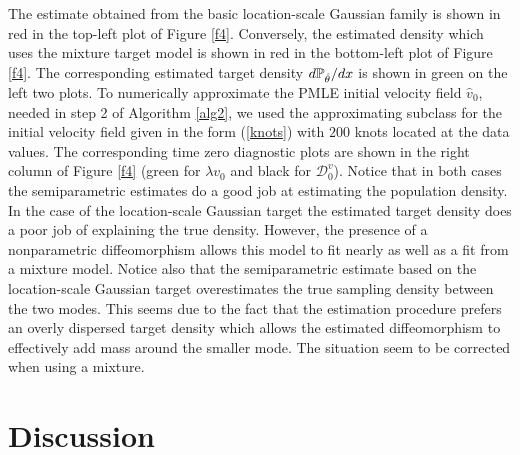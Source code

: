 \documentclass[noinfoline]{imsart}
\begin{document}
The estimate obtained from the basic location-scale Gaussian family is shown in red in the top-left plot of Figure \ref{f4}. Conversely, the estimated density which uses the mixture target model is shown in red in the bottom-left plot of Figure \ref{f4}.   The corresponding estimated target density $d\Bbb P_{\hat \theta}/dx$ is shown in green on the left two plots.
To numerically approximate the PMLE initial velocity field $\hat v_0$, needed in step 2 of Algorithm \ref{alg2},  we used the approximating subclass for the initial velocity field given in the form (\ref{knots}) with $200$ knots located at the data values.
The corresponding time zero diagnostic plots are shown in the right column of Figure \ref{f4} (green for $\lambda v_0$ and black for $\mathcal D_0^v$).  
 Notice that in both cases the semiparametric estimates do a good job at estimating the population density. 
In the case of the location-scale Gaussian target the estimated target density does a poor job of explaining the true density. However, the presence of a nonparametric diffeomorphism allows this model to fit nearly as well as a fit from a mixture model. Notice also that the semiparametric estimate based on the location-scale Gaussian target overestimates the true sampling density between the two modes. This seems due to the fact that the estimation procedure prefers an overly dispersed target density which  allows the estimated diffeomorphism to effectively add  mass around the smaller mode. The situation seem to be corrected when using a mixture. 





\section{Discussion}
\end{document}
